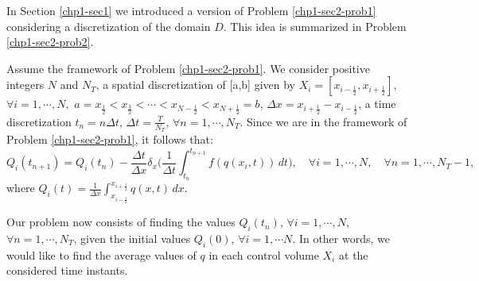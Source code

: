In Section \ref{chp1-sec1} we introduced a version of Problem \ref{chp1-sec2-prob1}
considering a discretization of the domain $D$. 
This idea is summarized in Problem \ref{chp1-sec2-prob2}.
\begin{prob}
    \label{chp1-sec2-prob2}
	Assume the framework of Problem \ref{chp1-sec2-prob1}.
        We consider positive integers $N$ and $N_T$, a spatial discretization of [a,b] given by
        $X_i = [x_{i-\frac{1}{2}}, x_{i+\frac{1}{2}}]$,
        $\forall i = 1, \cdots, N,$ 
	$a = x_{\frac{1}{2}} < x_{\frac{3}{2}} < \cdots < x_{N-\frac{1}{2}} < x_{N+\frac{1}{2}} = b$,
	$\Delta x = x_{i+\frac{1}{2}}-x_{i-\frac{1}{2}}$,
	a time discretization
        $t_n = n\Delta t$, $\Delta t = \frac{T}{N_T}$, $\forall n = 1, \cdots, N_T$.
	Since we are in the framework of Problem \ref{chp1-sec2-prob1}, it follows that:
        \begin{equation*}
                {Q}_i(t_{n+1}) =  {Q}_i(t_n) -
                \frac{\Delta t}{\Delta x} \delta _x\bigg( \frac{1}{\Delta t}\int_{t_n}^{t_{n+1}}
                {f}({q}(x_{i}, t)) \,dt \bigg),
                \quad \forall i = 1, \cdots, N,
                \quad \forall n = 1, \cdots, N_T-1,
        \end{equation*}
        where ${Q}_i(t) = \frac{1}{\Delta x}
        \int_{x_{i-\frac{1}{2}}}^{x_{i+\frac{1}{2}}} {q}(x,t) \,dx$.
	
	Our problem now consists of finding the values ${Q}_i(t_{n})$, 
	$\forall i = 1, \cdots, N$, $\forall n = 1, \cdots, N_T$,
	given the initial values ${Q}_i(0)$, $\forall i = 1, \cdots N$.
	In other words, we would like to find the average values of ${q}$
	in each control volume $X_i$ at the considered time instants.
\end{prob}

